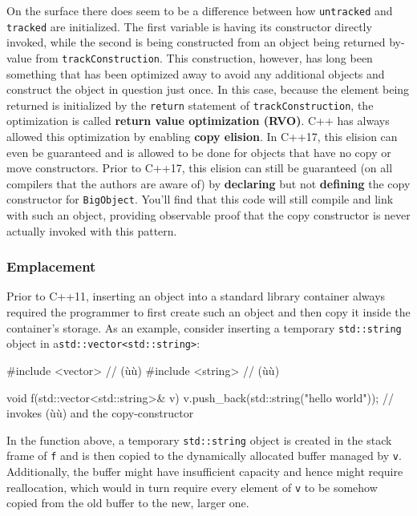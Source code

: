 \noindent On the surface there does seem to be a difference between how
\texttt{untracked} and \texttt{tracked} are initialized. The first
variable is having its constructor directly invoked, while the second is
being constructed from an object being returned by-value from
\texttt{trackConstruction}. This construction, however, has long been
something that has been optimized away to avoid any additional objects
and construct the object in question just once. In this case, because
the element being returned is initialized by the \texttt{return}
statement of \texttt{trackConstruction}, the optimization is called
\textbf{return value optimization (RVO)}. C++ has always
allowed this optimization by enabling \textbf{copy elision}. In C++17,
this elision can even be guaranteed and is allowed to be done for
objects that have no copy or move constructors. Prior to C++17, this
elision can still be guaranteed (on all compilers that the authors are
aware of) by \textbf{declaring} but not \textbf{defining} the copy
constructor for \texttt{BigObject}. You'll find that this code will
still compile and link with such an object, providing observable proof
that the copy constructor is never actually invoked with this pattern.

\subsubsection[Emplacement]{Emplacement}\label{emplacement}

Prior to C++11, inserting an object into a standard library container
always required the programmer to first create such an object and then
copy it inside the container's storage. As an example, consider
inserting a temporary \texttt{std::string} object in a\linebreak[4]
\mbox{\texttt{std::vector<std::string>}}:

\begin{emcppshiddenlisting}[emcppsbatch=e11]
#include <vector>  // (ù{}ù)
#include <string>  // (ù{}ù)
\end{emcppshiddenlisting}
\begin{emcppslisting}[emcppsbatch=e11]
void f(std::vector<std::string>& v)
{
    v.push_back(std::string("hello world"));
        // invokes (ù{}ù) and the copy-constructor
}
\end{emcppslisting}

\noindent In the function above, a temporary \texttt{std::string} object is
created in the stack frame of \texttt{f} and is then copied to the
dynamically allocated buffer managed by \texttt{v}. Additionally, the
buffer might have insufficient capacity and hence might require
reallocation, which would in turn require every element of \texttt{v} to
be somehow copied from the old buffer to the new, larger one.

